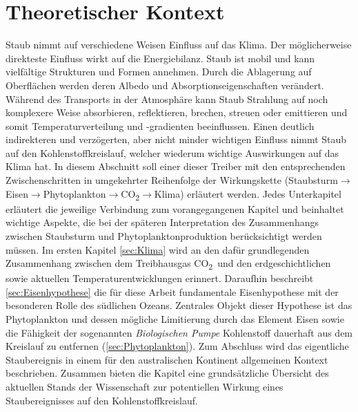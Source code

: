 \documentclass[12pt,a4paper,onecolumn]{scrartcl}
\newcommand{\cotwo}{CO\textsubscript{2}}
\begin{document}
\section{Theoretischer Kontext} \label{sec:Theorie}
Staub nimmt auf verschiedene Weisen Einfluss auf das Klima. Der möglicherweise direkteste Einfluss wirkt auf die Energiebilanz. Staub ist mobil und kann vielfältige Strukturen und Formen annehmen. Durch die Ablagerung auf Oberflächen werden deren Albedo und Absorptionseigenschaften verändert. Während des Transports in der Atmosphäre kann Staub Strahlung auf noch komplexere Weise absorbieren, reflektieren, brechen, streuen oder emittieren \citep{Shao.2011} und somit Temperaturverteilung und -gradienten beeinflussen. Einen deutlich indirekteren und verzögerten, aber nicht minder wichtigen Einfluss nimmt Staub auf den Kohlenstoffkreislauf, welcher wiederum wichtige Auswirkungen auf das Klima hat. In diesem Abschnitt soll einer dieser Treiber mit den entsprechenden Zwischenschritten in umgekehrter Reihenfolge der Wirkungskette (Staubsturm$\rightarrow$Eisen$\rightarrow$Phytoplankton$\rightarrow$\cotwo $\rightarrow$Klima) erläutert werden. Jedes Unterkapitel erläutert die jeweilige Verbindung zum vorangegangenen Kapitel und beinhaltet wichtige Aspekte, die bei der späteren Interpretation des Zusammenhangs zwischen Staubsturm und Phytoplanktonproduktion berücksichtigt werden müssen. Im ersten Kapitel \ref{sec:Klima} wird an den dafür grundlegenden Zusammenhang zwischen dem Treibhausgas \cotwo \ und den erdgeschichtlichen sowie aktuellen Temperaturentwicklungen erinnert. Daraufhin beschreibt \ref{sec:Eisenhypothese} die für diese Arbeit fundamentale Eisenhypothese mit der besonderen Rolle des südlichen Ozeans. Zentrales Objekt dieser Hypothese ist das Phytoplankton und dessen mögliche Limitierung durch das Element Eisen sowie die Fähigkeit der sogenannten \textit{Biologischen Pumpe} Kohlenstoff dauerhaft aus dem Kreislauf zu entfernen (\ref{sec:Phytoplankton}). Zum Abschluss wird das eigentliche Staubereignis in einem für den australischen Kontinent allgemeinen Kontext beschrieben. Zusammen bieten die Kapitel eine grundsätzliche Übersicht des aktuellen Stands der Wissenschaft zur potentiellen Wirkung eines Staubereignisses auf den Kohlenstoffkreislauf.
\end{document}
